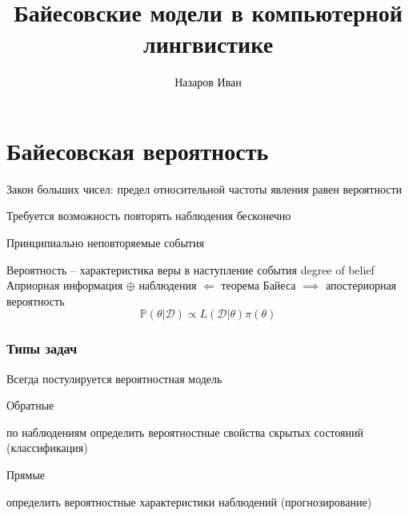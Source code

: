 \documentclass{beamer}
\newcommand{\eng}[1]{\foreignlanguage{english}{#1}}
\newcommand{\rus}[1]{\foreignlanguage{russian}{#1}}
\newcommand{\brac}[1]{\left ( #1 \right )}
\newcommand{\induc}[1]{\left . #1 \right \vert}
\newcommand{\Dcal}{\mathcal{D}}
\begin{document}
\title{Байесовские модели в компьютерной лингвистике}
\author{Назаров Иван}
\date

\frame{\titlepage}


\section{\rus{Байесовская вероятность}} %
\label{sec:probability}
\begin{frame}
  \begin{block}

    Закон больших чисел: предел относительной частоты явления равен вероятности
  \end{block}
  \begin{block}

    Требуется возможность повторять наблюдения бесконечно
  \end{block}

  \begin{block}{Принципиально неповторяемые события}

    Вероятность -- характеристика веры в наступление события \eng{degree of belief}
    Априорная информация $\oplus$ наблюдения $\Leftarrow$ теорема Байеса $\implies$ апостериорная вероятность
    \[\mathbb{P}\brac{\induc{\theta} \Dcal} \propto L\brac{\induc{\Dcal}\theta} \pi\brac{\theta}\]

  \end{block}
\end{frame}

\begin{frame}\frametitle{Типы задач}
  Всегда постулируется вероятностная модель
  \begin{block}{Обратные}

    по наблюдениям определить вероятностные свойства скрытых состояний (классификация)
  \end{block}
  \begin{block}{Прямые}

    определить вероятностные характеристики наблюдений (прогнозирование)
  \end{block}
\end{frame}
\end{document}
